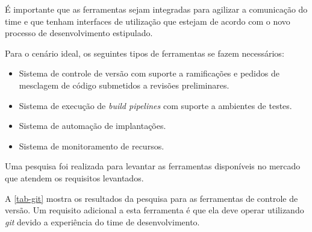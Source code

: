 \documentclass[
	12pt,				%
	openright,			%
	twoside,			%
	a4paper,			%
	english,			%
	french,				%
	spanish,			%
	brazil,				%
	]{abntex2}
\begin{document}
É importante que as ferramentas sejam integradas para agilizar a comunicação do time e que tenham interfaces de utilização que estejam de acordo com o novo processo de desenvolvimento estipulado.

Para o cenário ideal, os seguintes tipos de ferramentas se fazem necessários:

\begin{itemize}
	\item Sistema de controle de versão com suporte a ramificações e pedidos de mesclagem de código submetidos a revisões preliminares.
	\item Sistema de execução de \textit{build pipelines} com suporte a ambientes de testes.
	\item Sistema de automação de implantações.
	\item Sistema de monitoramento de recursos.
\end{itemize}

Uma pesquisa foi realizada para levantar as ferramentas disponíveis no mercado que atendem os requisitos levantados.

A \autoref{tab-git} mostra os resultados da pesquisa para as ferramentas de controle de versão. Um requisito adicional a esta ferramenta é que ela deve operar utilizando \textit{git} devido a experiência do time de desenvolvimento.
\end{document}
